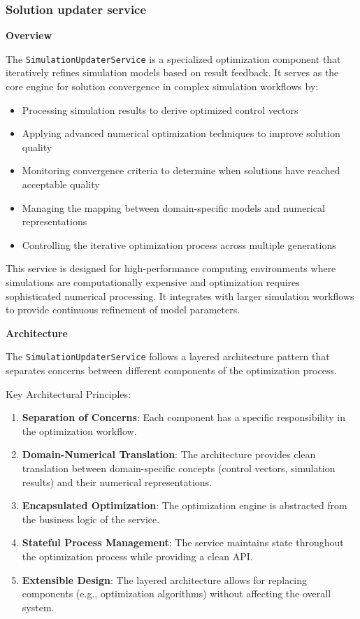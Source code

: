 \subsubsection{Solution updater service}
\textbf{Overview}

The \texttt{SimulationUpdaterService} is a specialized optimization component that iteratively refines simulation models based on result feedback. It serves as the core engine for solution convergence in complex simulation workflows by:

\begin{itemize}
	\item Processing simulation results to derive optimized control vectors
	\item Applying advanced numerical optimization techniques to improve solution quality
	\item Monitoring convergence criteria to determine when solutions have reached acceptable quality
	\item Managing the mapping between domain-specific models and numerical representations
	\item Controlling the iterative optimization process across multiple generations
\end{itemize}

This service is designed for high-performance computing environments where simulations are computationally expensive and optimization requires sophisticated numerical processing. It integrates with larger simulation workflows to provide continuous refinement of model parameters.

\bigskip
\textbf{Architecture}

The \texttt{SimulationUpdaterService} follows a layered architecture pattern that separates concerns between different components of the optimization process.

Key Architectural Principles:
\begin{enumerate}
	\item \textbf{Separation of Concerns}: Each component has a specific responsibility in the optimization workflow.

	\item \textbf{Domain-Numerical Translation}: The architecture provides clean translation between domain-specific concepts (control vectors, simulation results) and their numerical representations.

	\item \textbf{Encapsulated Optimization}: The optimization engine is abstracted from the business logic of the service.

	\item \textbf{Stateful Process Management}: The service maintains state throughout the optimization process while providing a clean API.

	\item \textbf{Extensible Design}: The layered architecture allows for replacing components (e.g., optimization algorithms) without affecting the overall system.
\end{enumerate}

